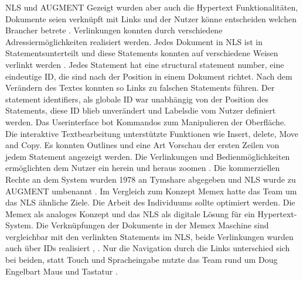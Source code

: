 \begin{section}{NLS und AUGMENT}
Gezeigt wurden aber auch die Hypertext Funktionalitäten, Dokumente seien verknüpft mit Links und der Nutzer könne entscheiden welchen \glqq Branch\grqq{ }er betrete \cite{MotherOfDemo1968}. Verlinkungen konnten durch verschiedene Adressiermöglichkeiten realisiert werden. Jedes Dokument in NLS ist in \glqq Statements\grqq{ }unterteilt und diese Statements konnten auf verschiedene Weisen verlinkt werden \cite{Engelbart1984}. Jedes Statement hat eine \glqq structural statement number\grqq{ }, eine eindeutige ID, die sind nach der Position in einem Dokument richtet. Nach dem Verändern des Textes konnten so Links zu falschen Statements führen. Der \glqq statement identifiers\grqq{ }, als globale ID war unabhängig von der Position des Statements, diese ID blieb unverändert und \glqq Labels\grqq{ }die vom Nutzer definiert werden. Das Userinterface bot Kommandos zum Manipulieren der Oberfläche. Die interaktive Textbearbeitung unterstützte Funktionen wie Insert, delete, Move and Copy. Es konnten Outlines und eine Art Vorschau der ersten Zeilen von jedem Statement angezeigt werden. Die Verlinkungen und Bedienmöglichkeiten ermöglichten dem Nutzer ein \glqq herein und heraus zoomen \grqq{ }\cite{MotherOfDemo1968}. Die kommerziellen Rechte an dem System wurden 1978 an Tymshare abgegeben und NLS wurde zu AUGMENT umbenannt \cite{Engelbart1984}. Im Vergleich zum Konzept Memex hatte das Team um das NLS ähnliche Ziele. Die Arbeit des Individuums sollte optimiert werden. Die Memex als analoges Konzept und das NLS als digitale Lösung für ein Hypertext-System. Die Verknüpfungen der Dokumente in der Memex Maschine sind vergleichbar mit den verlinkten Statements im NLS, beide Verlinkungen wurden auch über IDs realisiert \cite{Engelbart1984}, \cite{Bush1945}. Nur die Navigation durch die Links unterschied sich bei beiden, statt Touch und Spracheingabe \cite{Bush1945} nutzte das Team rund um Doug Engelbart Maus und Tastatur \cite{MotherOfDemo1968}.

\end{section}

